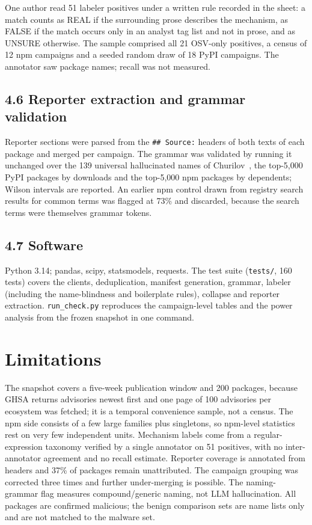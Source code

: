 \documentclass[preprint,12pt]{elsarticle}
\begin{document}
One author read 51 labeler positives under a written rule recorded in the sheet: a match counts as REAL if the surrounding prose describes the mechanism, as FALSE if the match occurs only in an analyst tag list and not in prose, and as UNSURE otherwise. The sample comprised all 21 OSV-only positives, a census of 12 npm campaigns and a seeded random draw of 18 PyPI campaigns. The annotator saw package names; recall was not measured.

\subsection*{4.6 Reporter extraction and grammar validation}

Reporter sections were parsed from the \texttt{\#\# Source:} headers of both texts of each package and merged per campaign. The grammar was validated by running it unchanged over the 139 universal hallucinated names of Churilov~\cite{churilov2026}, the top-5,000 PyPI packages by downloads and the top-5,000 npm packages by dependents; Wilson intervals are reported. An earlier npm control drawn from registry search results for common terms was flagged at 73\% and discarded, because the search terms were themselves grammar tokens.

\subsection*{4.7 Software}

Python 3.14; pandas, scipy, statsmodels, requests. The test suite (\texttt{tests/}, 160 tests) covers the clients, deduplication, manifest generation, grammar, labeler (including the name-blindness and boilerplate rules), collapse and reporter extraction. \texttt{run\_check.py} reproduces the campaign-level tables and the power analysis from the frozen snapshot in one command.

\section*{Limitations}

The snapshot covers a five-week publication window and 200 packages, because GHSA returns advisories newest first and one page of 100 advisories per ecosystem was fetched; it is a temporal convenience sample, not a census. The npm side consists of a few large families plus singletons, so npm-level statistics rest on very few independent units. Mechanism labels come from a regular-expression taxonomy verified by a single annotator on 51 positives, with no inter-annotator agreement and no recall estimate. Reporter coverage is annotated from headers and 37\% of packages remain unattributed. The campaign grouping was corrected three times and further under-merging is possible. The naming-grammar flag measures compound/generic naming, not LLM hallucination. All packages are confirmed malicious; the benign comparison sets are name lists only and are not matched to the malware set.
\end{document}
